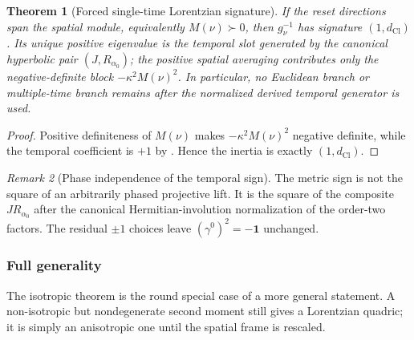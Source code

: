 \documentclass[11pt]{article}
\newtheorem{theorem}{Theorem}[section]
\theoremstyle{definition}
\theoremstyle{remark}
\newtheorem{remark}[theorem]{Remark}
\newcommand{\dCl}{d_{\mathrm{Cl}}}
\newcommand{\one}{\mathbf{1}}
\begin{document}
\begin{theorem}[Forced single-time Lorentzian signature]
\label{thm:signature-krein}
If the reset directions span the spatial module, equivalently
\(M(\nu)\succ0\), then \(g_\nu^{-1}\) has signature \((1,\dCl)\).  Its unique
positive eigenvalue is the temporal slot generated by the canonical hyperbolic
pair \((J,R_{\alpha_0})\); the positive spatial averaging contributes only the
negative-definite block \(-\kappa^2M(\nu)^2\).  In particular, no Euclidean
branch or multiple-time branch remains after the normalized derived temporal
generator is used.
\end{theorem}

\begin{proof}
Positive definiteness of \(M(\nu)\) makes
\(-\kappa^2M(\nu)^2\) negative definite, while the temporal coefficient is
\(+1\) by .  Hence the
inertia is exactly \((1,\dCl)\).
\end{proof}

\begin{remark}[Phase independence of the temporal sign]
The metric sign is not the square of an arbitrarily phased projective lift.
It is the square of the composite \(J R_{\alpha_0}\) after the canonical
Hermitian-involution normalization of the order-two factors.  The residual
\(\pm1\) choices leave \((\gamma^0)^2=-\one\) unchanged.
\end{remark}

\subsubsection{Full generality}

The isotropic theorem is the round special case of a more general statement.
A non-isotropic but nondegenerate second moment still gives a Lorentzian
quadric; it is simply an anisotropic one until the spatial frame is rescaled.
\end{document}
